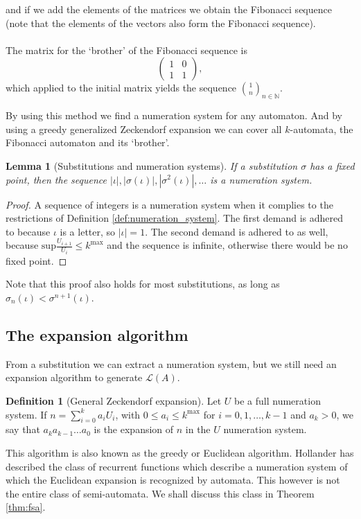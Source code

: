 \documentclass{article}
\newtheorem{lemma}[theorem]{Lemma}
\theoremstyle{definition}
\newtheorem{definition}[theorem]{Definition}
\begin{document}
and if we add the elements of the matrices we obtain the Fibonacci sequence 
(note that the elements of the vectors also form the Fibonacci sequence).\\
\\
The matrix for the `brother' of the Fibonacci sequence is
\begin{displaymath} \left( \begin{array}{cc}
1 & 0\\
1 & 1
\end{array} \right), \end{displaymath}
which applied to the initial matrix yields the sequence 
${1 \choose n}_{n \in \mathbb{N}}$.

By using this method we find a numeration system for any automaton. And by 
using a greedy generalized Zeckendorf expansion we can cover all $k$-automata, 
the Fibonacci automaton and its `brother'.

\begin{lemma}[Substitutions and numeration systems] \label{lem:subst-numsys}
If a substitution $\sigma$ has a fixed point, then the sequence
$|\iota|, |\sigma(\iota)|, |\sigma^2(\iota)|, \ldots$ is a numeration system.
\end{lemma}

\begin{proof}
A sequence of integers is a numeration system when it complies to the 
restrictions of Definition \ref{def:numeration_system}. The first demand is 
adhered to because $\iota$ is a letter, so $|\iota| = 1$. The second demand
is adhered to as well, because 
$\mathrm{sup}\frac{U_{i + 1}}{U_i} \le k^{\mathrm{max}}$ and the sequence is 
infinite, otherwise there would be no fixed point.
\end{proof}

Note that this proof also holds for most substitutions, as long as 
$\sigma_n(\iota) < \sigma^{n + 1}(\iota)$.

\subsection{The expansion algorithm} \label{sec:ea}
From a substitution we can extract a numeration system, but we still need an
expansion algorithm to generate $\mathcal{L}(A)$. 

\begin{definition}[General Zeckendorf expansion] \label{def:greedy}
Let $U$ be a full numeration system. If 
$n = \sum_{i = 0}^k a_i U_i$, with 
$0 \le a_i \le k^{\mathrm{max}}$ for $i = 0, 1, \ldots, k - 1$ and 
$a_k > 0$, we say that $a_k a_{k - 1} \ldots a_0$ is the expansion of
$n$ in the $U$ numeration system.
\end{definition}
This algorithm is also known as the greedy or Euclidean algorithm. Hollander 
\cite{Hol} has described the class of recurrent functions which describe a 
numeration system of which the Euclidean expansion is recognized by automata. 
This however is not the entire class of semi-automata. We shall discuss this 
class in Theorem \ref{thm:fsa}.
\end{document}
